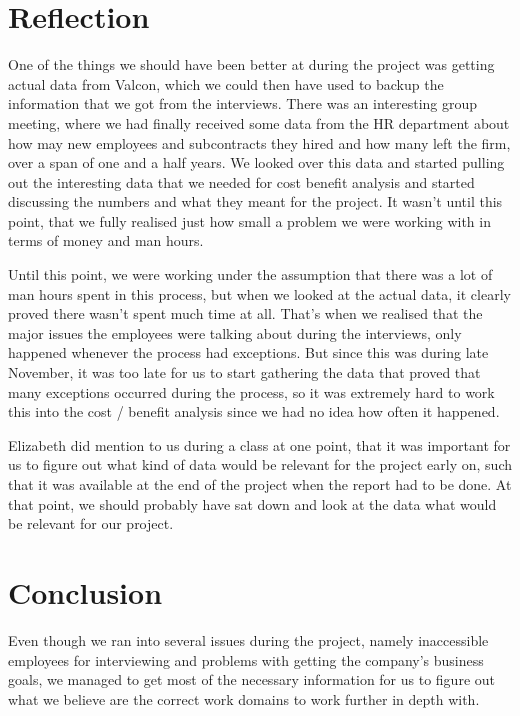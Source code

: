 \section{Reflection}
One of the things we should have been better at during the project was getting actual data from Valcon, which we could then have used to backup the information that we got from the interviews. There was an interesting group meeting, where we had finally received some data from the HR department about how may new employees and subcontracts they hired and how many left the firm, over a span of one and a half years. We looked over this data and started pulling out the interesting data that we needed for cost benefit analysis and started discussing the numbers and what they meant for the project. It wasn't until this point, that we fully realised just how small a problem we were working with in terms of money and man hours. 

Until this point, we were working under the assumption that there was a lot of man hours spent in this process, but when we looked at the actual data, it clearly proved there wasn't spent much time at all. That's when we realised that the major issues the employees were talking about during the interviews, only happened whenever the process had exceptions. But since this was during late November, it was too late for us to start gathering the data that proved that many exceptions occurred during the process, so it was extremely hard to work this into the cost / benefit analysis since we had no idea how often it happened.

Elizabeth did mention to us during a class at one point, that it was important for us to figure out what kind of data would be relevant for the project early on, such that it was available at the end of the project when the report had to be done. At that point, we should probably have sat down and look at the data what would be relevant for our project.

\section{Conclusion}
Even though we ran into several issues during the project, namely inaccessible employees for interviewing and problems with getting the company’s business goals, we managed to get most of the necessary information for us to figure out what we believe are the correct work domains to work further in depth with.